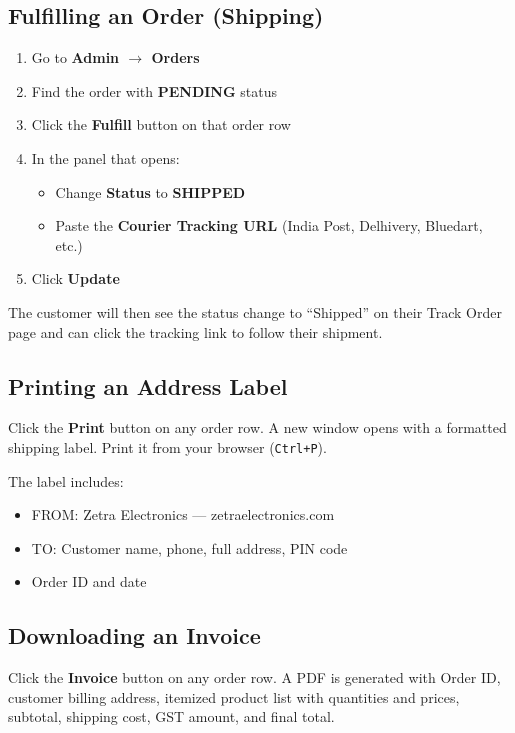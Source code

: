 \documentclass[12pt,a4paper]{article}
\begin{document}
\subsection{Fulfilling an Order (Shipping)}

\begin{enumerate}[leftmargin=2em, itemsep=4pt]
  \item Go to \textbf{Admin $\rightarrow$ Orders}
  \item Find the order with \textbf{PENDING} status
  \item Click the \textbf{Fulfill} button on that order row
  \item In the panel that opens:
    \begin{itemize}
      \item Change \textbf{Status} to \textbf{SHIPPED}
      \item Paste the \textbf{Courier Tracking URL} (India Post, Delhivery, Bluedart, etc.)
    \end{itemize}
  \item Click \textbf{Update}
\end{enumerate}

The customer will then see the status change to ``Shipped'' on their Track Order page and can click the tracking link to follow their shipment.

\subsection{Printing an Address Label}

Click the \textbf{Print} button on any order row. A new window opens with a formatted shipping label. Print it from your browser (\texttt{Ctrl+P}).

The label includes:
\begin{itemize}[leftmargin=1.5em, itemsep=3pt]
  \item FROM: Zetra Electronics — zetraelectronics.com
  \item TO: Customer name, phone, full address, PIN code
  \item Order ID and date
\end{itemize}

\subsection{Downloading an Invoice}

Click the \textbf{Invoice} button on any order row. A PDF is generated with Order ID, customer billing address, itemized product list with quantities and prices, subtotal, shipping cost, GST amount, and final total.
\end{document}
